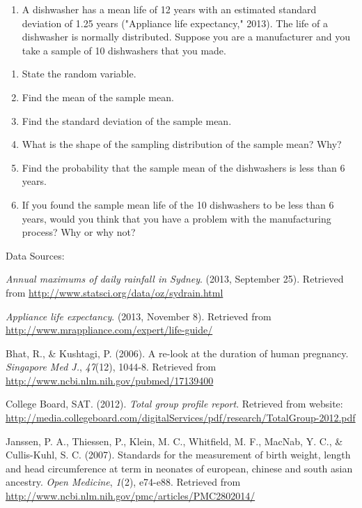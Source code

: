 \documentclass[]{book}
\providecommand{\tightlist}{%
  \setlength{\itemsep}{0pt}\setlength{\parskip}{0pt}}
\begin{document}
\begin{enumerate}
\def\labelenumi{\arabic{enumi}.}
\setcounter{enumi}{7}
\tightlist
\item
  A dishwasher has a mean life of 12 years with an estimated standard deviation of 1.25 years ("Appliance life expectancy," 2013). The life of a dishwasher is normally distributed. Suppose you are a manufacturer and you take a sample of 10 dishwashers that you made.
\end{enumerate}

\begin{enumerate}
\def\labelenumi{\alph{enumi}.}
\tightlist
\item
  State the random variable.
\item
  Find the mean of the sample mean.
\item
  Find the standard deviation of the sample mean.
\item
  What is the shape of the sampling distribution of the sample mean? Why?
\item
  Find the probability that the sample mean of the dishwashers is less than 6 years.
\item
  If you found the sample mean life of the 10 dishwashers to be less than 6 years, would you think that you have a problem with the manufacturing process? Why or why not?
\end{enumerate}

Data Sources:

\emph{Annual maximums of daily rainfall in Sydney}. (2013, September 25).
Retrieved from \url{http://www.statsci.org/data/oz/sydrain.html}

\emph{Appliance life expectancy}. (2013, November 8). Retrieved from
\url{http://www.mrappliance.com/expert/life-guide/}

Bhat, R., \& Kushtagi, P. (2006). A re-look at the duration of human
pregnancy. \emph{Singapore Med J.}, \emph{47}(12), 1044-8. Retrieved from
\url{http://www.ncbi.nlm.nih.gov/pubmed/17139400}

College Board, SAT. (2012). \emph{Total group profile report}. Retrieved from
website:
\url{http://media.collegeboard.com/digitalServices/pdf/research/TotalGroup-2012.pdf}

Janssen, P. A., Thiessen, P., Klein, M. C., Whitfield, M. F., MacNab, Y.
C., \& Cullis-Kuhl, S. C. (2007). Standards for the measurement of birth
weight, length and head circumference at term in neonates of european,
chinese and south asian ancestry. \emph{Open Medicine}, \emph{1}(2), e74-e88.
Retrieved from \url{http://www.ncbi.nlm.nih.gov/pmc/articles/PMC2802014/}
\end{document}
